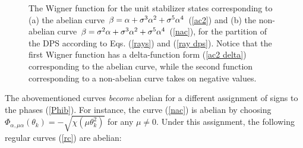 \documentclass[quantumrep,article,submit,pdftex,moreauthors]{Definitions/mdpi}
\begin{document}
\begin{figure}[ht]
  \centering
  \quad 
  \caption{
    The Wigner function for the unit stabilizer states corresponding to (a) the
    abelian curve $\protect\beta = \protect\alpha + \protect\sigma^3
    \protect\alpha^2 + \protect\sigma^5 \protect\alpha^4$ (\protect\ref{ac2})
    and (b) the non-abelian curve $\protect\beta = \protect\sigma^2 \protect
    \alpha + \protect\sigma^3 \protect\alpha^2 +
    \protect\sigma^{5}\protect\alpha^{4}$ (\protect\ref{nac}), for the partition
    of the DPS according to Eqs. (\protect\ref{rays}) and (\protect\ref{ray
    dps}). Notice that the first Wigner function has a delta-function form
    (\protect\ref{ac2 delta}) corresponding to the abelian curve, while the
    second function corresponding to a non-abelian curve takes on negative
    values.
  }
  \label{fig2}
\end{figure}

The abovementioned curves \textit{become} abelian for a different assignment of
signs to the phases (\ref{Phib}). For instance, the curve (\ref{nac}) is abelian
by choosing
$\Phi_{\alpha,\mu\alpha}(\theta_{k})=-\sqrt{\chi\left(\mu\theta_{k}^{2}\right)}$
for any $\mu \neq 0$. Under this assignment, the following regular curves
(\ref{rc}) are abelian:
\end{document}
